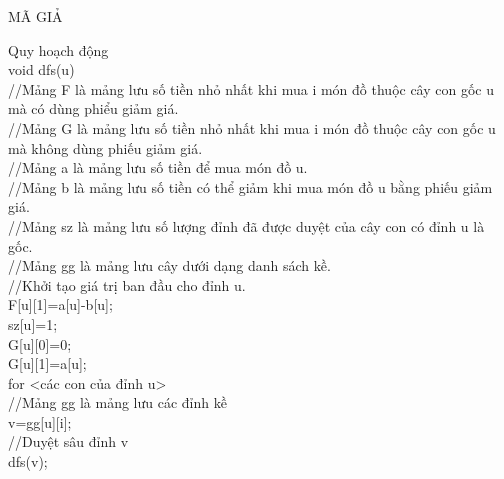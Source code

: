 \documentclass[10pt,a4paper]{article}
\begin{document}
\begin{center}
    \fontsize{30}{30}\selectfont
    MÃ GIẢ \\
\end{center}

\fontsize{14}{20}\selectfont

\begin{flushleft}
Quy hoạch động \\
void dfs(u)\\
\hspace{1 cm} //Mảng F là mảng lưu số tiền nhỏ nhất khi mua i món đồ thuộc cây con gốc u mà có dùng phiểu giảm giá.\\
\hspace{1 cm} //Mảng G là mảng lưu số tiền nhỏ nhất khi mua i món đồ thuộc cây con gốc u mà không dùng phiếu giảm giá.\\
\hspace{1 cm} //Mảng a là mảng lưu số tiền để mua món đồ u.\\
\hspace{1 cm} //Mảng b là mảng lưu số tiền có thể giảm khi mua món đồ u bằng phiếu giảm giá.\\
\hspace{1 cm} //Mảng sz là mảng lưu số lượng đỉnh đã được duyệt của cây con có đỉnh u là gốc.\\
\hspace{1 cm} //Mảng gg là mảng lưu cây dưới dạng danh sách kề.\\
\hspace{1 cm} //Khởi tạo giá trị ban đầu cho đỉnh u.\\
\hspace{1 cm} F[u][1]=a[u]-b[u]; \\
\hspace{1 cm} sz[u]=1; \\
\hspace{1 cm} G[u][0]=0;\\
\hspace{1 cm} G[u][1]=a[u];\\
\hspace{1 cm} for <các con của đỉnh u> \\
\hspace{2 cm} //Mảng gg là mảng lưu các đỉnh kề\\
\hspace{2 cm} v=gg[u][i];\\
\hspace{2 cm} //Duyệt sâu đỉnh v \\
\hspace{2 cm} dfs(v);\\

\end{flushleft}
\end{document}
